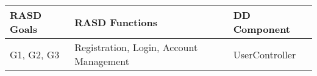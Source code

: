 \begin{center}
	\vspace{0.6cm}
	\begin{tabular}{|l|l|l|}
		\hline
		RASD Goals & RASD Functions & DD Component \\\hline
		\hline
		G1, G2, G3 & Registration, Login, Account Management & UserController \\\hline
	\end{tabular}
\end{center}